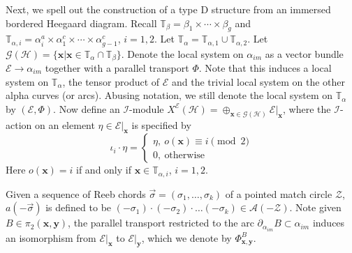 \documentclass{amsart}
\theoremstyle{definition}
\theoremstyle{remark}
\numberwithin{equation}{section}
\numberwithin{equation}{section} \makeatletter
\begin{document}
Next, we spell out the construction of a type D structure from an immersed bordered Heegaard diagram. Recall $\mathbb{T}_{\beta}=\beta_1\times\cdots \times\beta_g$ and $\mathbb{T}_{\alpha,i}=\alpha^a_i\times \alpha_1^c\times\cdots\times\alpha_{g-1}^c$, $i=1,2$. Let $\mathbb{T}_{\alpha}=\mathbb{T}_{\alpha,1}\cup \mathbb{T}_{\alpha, 2}$. Let $\mathcal{G}(\mathcal{H})=\{\bm{x}|\bm{x}\in\mathbb{T}_{\alpha}\cap \mathbb{T}_{\beta}\}$. Denote the local system on $\alpha_{im}$ as a vector bundle $\mathcal{E}\rightarrow \alpha_{im}$ together with a parallel transport $\Phi$. Note that this induces a local system on $\mathbb{T}_{\alpha}$, the tensor product of $\mathcal{E}$ and the trivial local system on the other alpha curves (or arcs). Abusing notation, we still denote the local system on $\mathbb{T}_{\alpha}$ by $(\mathcal{E},\Phi)$. Now define an $\mathcal{I}$-module $X^\mathcal{E}(\mathcal{H})=\oplus_{\bm{x}\in \mathcal{G}(\mathcal{H})} \mathcal{E}|_{\bm{x}}$, where the $\mathcal{I}$-action on an element $\eta\in \mathcal{E}|_{\bm{x}}$ is specified by $$\iota_i\cdot \eta=\begin{cases} \eta, \ o(\bm{x})\equiv i \pmod 2\\ 0,\  \text{otherwise} \end{cases}$$
Here $o(\bm{x})=i$ if and only if $\bm{x}\in \mathbb{T}_{\alpha,i}$, $i=1,2$.

Given a sequence of Reeb chords $\overrightarrow{\sigma}=(\sigma_1,\ldots,\sigma_k)$ of a pointed match circle $\mathcal{Z}$, $a(-\overrightarrow{\sigma})$ is defined to be $(-\sigma_1)\cdot(-\sigma_2)\cdot \ldots (-\sigma_k)\in \mathcal{A}(-\mathcal{Z})$. Note given $B\in \pi_2(\bm{x},\bm{y})$, the parallel transport restricted to the arc $\partial_{\alpha_{im}}B\subset \alpha_{im}$ induces an isomorphism from $\mathcal{E}|_{\bm{x}}$ to $\mathcal{E}|_{\bm{y}}$, which we denote by $\Phi^{B}_{\bm{x},\bm{y}}$.
\end{document}
